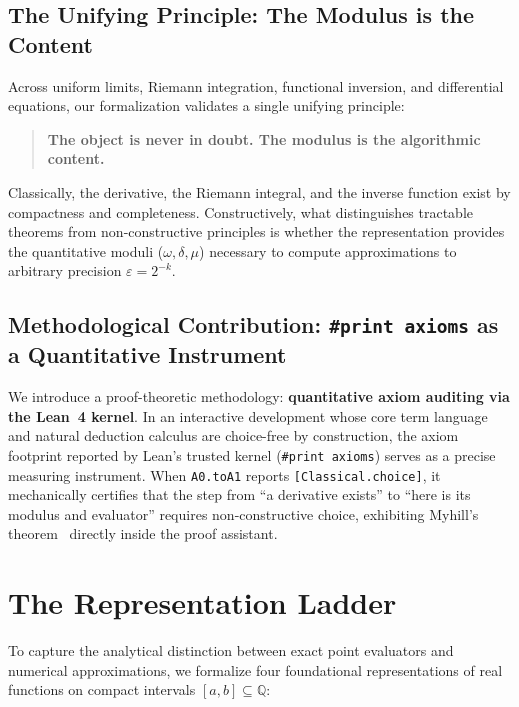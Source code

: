\documentclass[11pt,a4paper]{article}
\theoremstyle{definition}
\theoremstyle{remark}
\newcommand{\Q}{\ensuremath{\mathbb{Q}}}
\begin{document}
\subsection{The Unifying Principle: The Modulus is the Content}
Across uniform limits, Riemann integration, functional inversion, and differential equations, our formalization validates a single unifying principle:
\begin{quote}
\centering
\textbf{The object is never in doubt. The modulus is the algorithmic content.}
\end{quote}
Classically, the derivative, the Riemann integral, and the inverse function exist by compactness and completeness. Constructively, what distinguishes tractable theorems from non-constructive principles is whether the representation provides the quantitative moduli ($\omega, \delta, \mu$) necessary to compute approximations to arbitrary precision $\varepsilon = 2^{-k}$.

\subsection{Methodological Contribution: \texttt{\#print axioms} as a Quantitative Instrument}
We introduce a proof-theoretic methodology: \textbf{quantitative axiom auditing via the Lean~4 kernel}. In an interactive development whose core term language and natural deduction calculus are choice-free by construction, the axiom footprint reported by Lean's trusted kernel (\texttt{\#print axioms}) serves as a precise measuring instrument. When \texttt{A0.toA1} reports \texttt{[Classical.choice]}, it mechanically certifies that the step from ``a derivative exists'' to ``here is its modulus and evaluator'' requires non-constructive choice, exhibiting Myhill's theorem~\cite{myhill1971} directly inside the proof assistant.

\section{The Representation Ladder}

To capture the analytical distinction between exact point evaluators and numerical approximations, we formalize four foundational representations of real functions on compact intervals $[a, b] \subseteq \Q$:
\end{document}
